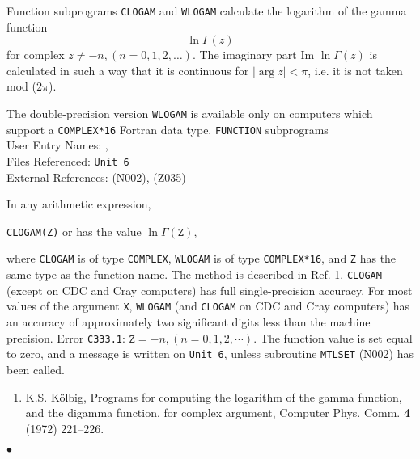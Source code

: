                     
               
\Submitter{}                         
                    
Function subprograms {\tt CLOGAM} and {\tt WLOGAM} calculate
the logarithm of the gamma function
$$ \displaystyle\ln \Gamma(z)$$
for complex $z \neq -n, (n=0,1,2,\ldots)$. The imaginary part
Im $\ln \Gamma(z)$ is calculated in such a way that it is continuous
for $|\arg z|<\pi$, i.e. it is not taken mod ($2\pi$).
\par
The double-precision version {\tt WLOGAM} is available only on computers
which support a {\tt COMPLEX*16} Fortran data type.
\Structure
{\tt FUNCTION} subprograms\\
User Entry Names: , \\
Files Referenced: {\tt Unit 6} \\
External References:  (N002),  (Z035)
 
\Usage
In any arithmetic expression,
\begin{center}
{\tt CLOGAM(Z)} \quad or  \quad has the value \quad
$\ln \Gamma(\mathtt{Z})$,
\end{center}
where {\tt CLOGAM} is of type {\tt COMPLEX}, {\tt WLOGAM} is of type
{\tt COMPLEX*16}, and {\tt Z} has the same type as the function name.
\Method
The method is described in Ref. 1.
\Accuracy
{\tt CLOGAM} (except on CDC and Cray computers)
has full single-precision accuracy.
For most values of the argument {\tt X}, {\tt WLOGAM}
(and {\tt CLOGAM} on CDC and Cray computers) has an accuracy of
approximately two significant digits less than the machine precision.
\Errorh
Error {\tt C333.1}: $\mathtt{Z} = -n,(n = 0,1,2,\cdots).$
The function value is set equal to zero, and a message is written on
{\tt Unit 6}, unless subroutine {\tt MTLSET} (N002) has been called.
\Refer
\begin{enumerate}
\item K.S. K\"olbig, Programs for computing the
logarithm of the gamma function, and the digamma function, for
complex argument, Computer Phys. Comm. {\bf 4} (1972) 221--226.
\end{enumerate}
$\bullet$

